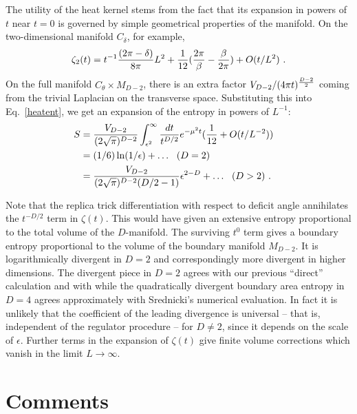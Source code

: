\documentclass[12pt]{article}
\begin{document}
The utility of the heat kernel stems from the fact that its expansion
in powers of $t$ near $t=0$ is governed by simple geometrical properties
of the manifold\cite{balian,alvarez}. On the two-dimensional manifold
$C_\delta$, for example,
\begin{equation}
\zeta_2(t) = t^{-1}{(2\pi-\delta)\over 8\pi} L^2 +
	{1\over {12}} ({2\pi \over \beta} - {\beta \over 2\pi})
+ O(t/L^2) ~.
\end{equation}
On the full manifold $C_\theta\times M_{D-2}$, there is an extra factor
$V_{D-2}/(4\pi t)^{{D-2\over 2}}$ coming from the trivial Laplacian on the
transverse space. Substituting this into Eq.~\ref{heatent}, we get an
expansion of the entropy in powers of $L^{-1}$:
\begin{align}
S & = {V_{D-2}\over(2\sqrt{\pi})^{D-2}}\int_{\epsilon^2}^\infty {dt\over
t^{D/2}}
	e^{-\mu^2 t}({1\over 12}+O(t/L^{-2}))\cr
    & = (1/6)\ln(1/\epsilon) + \ldots~~(D=2)\cr
    & = {V_{D-2}\over(2\sqrt{\pi})^{D-2}(D/2-1)}\epsilon^{2-D}+\ldots~~(D>2)~.
\end{align}

Note that the replica trick differentiation with respect to deficit
angle annihilates the $t^{-D/2}$ term in $\zeta(t)$. This would have given
an extensive entropy proportional to the total volume of the $D$-manifold.
The surviving $t^{0}$ term gives a boundary entropy proportional to the volume
of the boundary manifold $M_{D-2}$. It is logarithmically divergent in $D=2$
and correspondingly more divergent in higher dimensions. The divergent piece in
$D=2$ agrees with our previous ``direct'' calculation and with \cite{Holzhey}
while the quadratically divergent boundary area entropy in
$D=4$ agrees approximately with
 Srednicki's numerical evaluation\cite{Srednicki}. In fact it is
unlikely that the coefficient of the leading divergence is
universal -- that is, independent of the regulator
procedure -- for $D \not= 2$, since it depends on the scale of
$\epsilon$.
Further terms in the expansion of $\zeta(t)$ give
finite volume corrections which vanish in the limit $L\to\infty$.

\section{Comments}
\end{document}

